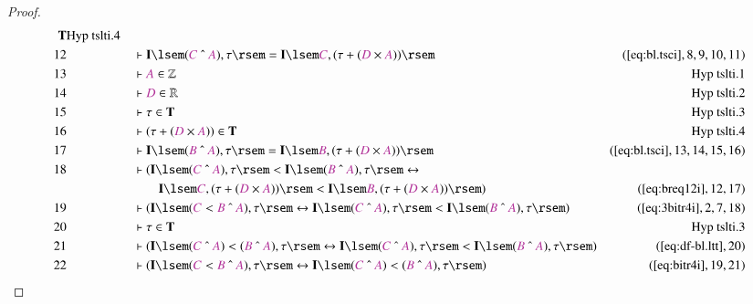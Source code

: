 \begin{proof}
\begin{align}
      \mathbf{T}&\text{Hyp~tslti.4}\notag%
  \\ 12 &&  & \vdash \mathbf{I} \lsem ( \mc{C} ~\string^~ \mc{A} ) , \tau \rsem
      = \mathbf{I} \lsem \mc{C} , ( \tau + ( \mc{D} \times
      \mc{A} ) )
      \rsem&(\mbox{\ref{eq:bl.tsci}},8,9,10,11)\notag
  \\ 13 &&  & \vdash \mc{A} \in \mathbb{Z}&\text{Hyp~tslti.1}\notag%
  \\ 14 &&  & \vdash \mc{D} \in \mathbb{R}&\text{Hyp~tslti.2}\notag%
  \\ 15 &&  & \vdash \tau \in \mathbf{T}&\text{Hyp~tslti.3}\notag%
  \\ 16 &&  & \vdash ( \tau + ( \mc{D} \times \mc{A} ) ) \in
      \mathbf{T}&\text{Hyp~tslti.4}\notag%
  \\ 17 &&  & \vdash \mathbf{I} \lsem ( \mc{B} ~\string^~ \mc{A} ) , \tau \rsem
      = \mathbf{I} \lsem \mc{B} , ( \tau + ( \mc{D} \times
      \mc{A} ) )
      \rsem&(\mbox{\ref{eq:bl.tsci}},13,14,15,16)\notag
  \\ 18 &&  & \vdash ( \mathbf{I} \lsem ( \mc{C} ~\string^~ \mc{A} ) , \tau
      \rsem < \mathbf{I} \lsem ( \mc{B} ~\string^~ \mc{A} )
      , \tau \rsem \leftrightarrow  \notag \\ & & & \qquad
     \mathbf{I} \lsem \mc{C}
      , ( \tau + ( \mc{D} \times \mc{A} ) ) \rsem <
      \mathbf{I} \lsem \mc{B} , ( \tau + ( \mc{D} \times
      \mc{A} ) ) \rsem
      )&(\mbox{\ref{eq:breq12i}},12,17)\notag
  \\ 19 &&  & \vdash ( \mathbf{I} \lsem ( \mc{C} < \mc{B} ~\string^~ \mc{A} ) ,
      \tau \rsem \leftrightarrow \mathbf{I} \lsem ( \mc{C}
      ~\string^~ \mc{A} ) , \tau \rsem < \mathbf{I} \lsem (
      \mc{B} ~\string^~ \mc{A} ) , \tau \rsem
      )&(\mbox{\ref{eq:3bitr4i}},2,7,18)\notag
  \\ 20 &&  & \vdash \tau \in \mathbf{T}&\text{Hyp~tslti.3}\notag%
  \\ 21 &&  & \vdash ( \mathbf{I} \lsem ( \mc{C} ~\string^~ \mc{A} ) < ( \mc{B}
      ~\string^~ \mc{A} ) , \tau \rsem \leftrightarrow
      \mathbf{I} \lsem ( \mc{C} ~\string^~ \mc{A} ) , \tau
      \rsem < \mathbf{I} \lsem ( \mc{B} ~\string^~ \mc{A} )
      , \tau \rsem )&(\mbox{\ref{eq:df-bl.ltt}},20)\notag
  \\ 22 &&  & \vdash ( \mathbf{I} \lsem ( \mc{C} < \mc{B} ~\string^~ \mc{A} ) ,
      \tau \rsem \leftrightarrow \mathbf{I} \lsem ( \mc{C}
      ~\string^~ \mc{A} ) < ( \mc{B} ~\string^~ \mc{A} ) ,
      \tau \rsem )&(\mbox{\ref{eq:bitr4i}},19,21)\notag

\end{align}
\end{proof}
